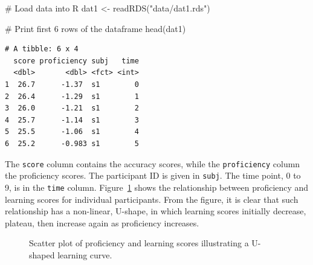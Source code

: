 \documentclass[
  letterpaper,
  DIV=11,
  numbers=noendperiod]{scrartcl}
\newenvironment{Shaded}{\begin{snugshade}}{\end{snugshade}}
\newcommand{\CommentTok}[1]{\textcolor[rgb]{0.37,0.37,0.37}{#1}}
\newcommand{\FunctionTok}[1]{\textcolor[rgb]{0.28,0.35,0.67}{#1}}
\newcommand{\NormalTok}[1]{\textcolor[rgb]{0.00,0.23,0.31}{#1}}
\newcommand{\OtherTok}[1]{\textcolor[rgb]{0.00,0.23,0.31}{#1}}
\newcommand{\StringTok}[1]{\textcolor[rgb]{0.13,0.47,0.30}{#1}}
\begin{document}
\begin{Shaded}
\begin{Highlighting}[]
\CommentTok{\# Load data into R}
\NormalTok{dat1 }\OtherTok{\textless{}{-}} \FunctionTok{readRDS}\NormalTok{(}\StringTok{"data/dat1.rds"}\NormalTok{)}

\CommentTok{\# Print first 6 rows of the dataframe}
\FunctionTok{head}\NormalTok{(dat1)}
\end{Highlighting}
\end{Shaded}

\begin{verbatim}
# A tibble: 6 x 4
  score proficiency subj   time
  <dbl>       <dbl> <fct> <int>
1  26.7      -1.37  s1        0
2  26.4      -1.29  s1        1
3  26.0      -1.21  s1        2
4  25.7      -1.14  s1        3
5  25.5      -1.06  s1        4
6  25.2      -0.983 s1        5
\end{verbatim}

The \texttt{score} column contains the accuracy scores, while the
\texttt{proficiency} column the proficiency scores. The participant ID
is given in \texttt{subj}. The time point, 0 to 9, is in the
\texttt{time} column. Figure~\ref{fig-dat1} shows the relationship
between proficiency and learning scores for individual participants.
From the figure, it is clear that such relationship has a non-linear,
U-shape, in which learning scores initially decrease, plateau, then
increase again as proficiency increases.

\begin{figure}


\caption{\label{fig-dat1}Scatter plot of proficiency and learning scores
illustrating a U-shaped learning curve.}

\end{figure}%
\end{document}
